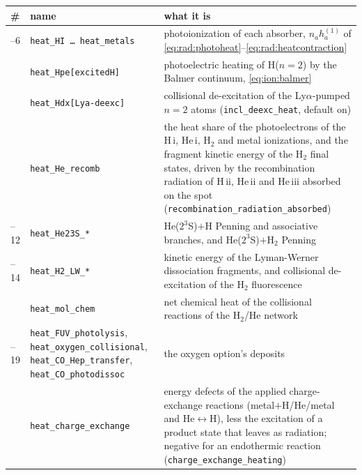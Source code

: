 \begin{center}
\begin{tabular}{@{}>{\raggedright\arraybackslash}p{}>{\raggedright\arraybackslash}p{}>{\raggedright\arraybackslash}p{}@{}}
\toprule
\# & name & what it is\\
\midrule
1--6 & \texttt{heat\_HI \dots\ heat\_metals} &
  photoionization of each absorber, $n_a h^{(1)}_a$ of
  \eqref{eq:rad:photoheat}--\eqref{eq:rad:heatcontraction}\\
7  & \texttt{heat\_Hpe[excitedH]} & photoelectric heating of H($n{=}2$) by
     the Balmer continuum, \eqref{eq:ion:balmer}\\
8  & \texttt{heat\_Hdx[Lya-deexc]} & collisional de-excitation of the
     Ly$\alpha$-pumped $n=2$ atoms (\texttt{incl\_deexc\_heat}, default on)\\
9  & \texttt{heat\_He\_recomb} & the heat share of the photoelectrons of
     the H\,{\sc i}, He\,{\sc i}, H$_2$ and metal ionizations, and the
     fragment kinetic energy of the H$_2$ final states, driven by the
     recombination radiation of H\,{\sc ii}, He\,{\sc ii} and He\,{\sc iii}
     absorbed on the spot (\texttt{recombination\_radiation\_absorbed})\\
10--12 & \texttt{heat\_He23S\_*} & He($2^3$S)$+$H Penning and associative
     branches, and He($2^3$S)$+$H$_2$ Penning\\
13--14 & \texttt{heat\_H2\_LW\_*} & kinetic energy of the Lyman-Werner
     dissociation fragments, and collisional de-excitation of the H$_2$
     fluorescence\\
15 & \texttt{heat\_mol\_chem} & net chemical heat of the collisional
     reactions of the H$_2$/He network\\
16--19 & \texttt{heat\_FUV\_photolysis}, \texttt{heat\_oxygen\_collisional},
     \texttt{heat\_CO\_Hep\_transfer}, \texttt{heat\_CO\_photodissoc} &
     the oxygen option's deposits\\
20 & \texttt{heat\_charge\_exchange} & energy defects of the applied
     charge-exchange reactions (metal$+$H/He/metal and He$\leftrightarrow$H),
     less the excitation of a product state that leaves as radiation;
     negative for an endothermic reaction
     (\texttt{charge\_exchange\_heating})\\
\bottomrule
\end{tabular}
\end{center}

